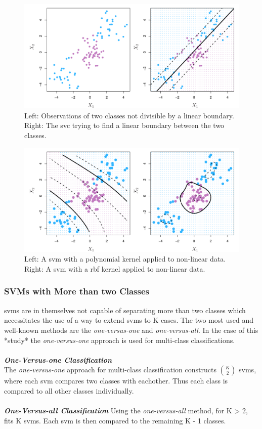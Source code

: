 \documentclass[11pt]{article}
\begin{document}
\begin{figure}[ht]
  \centering
  \includegraphics[width=12cm]{graphics/9_8.pdf}
  \caption{Left: Observations of two classes not divisible by a linear boundary. Right: The \gls{svc} trying to find a linear boundary between the two classes.}
\end{figure}

\begin{figure}[ht]
  \centering
  \includegraphics[width=12cm]{graphics/9_9.pdf}
  \caption{Left: A \gls{svm} with a polynomial kernel applied to non-linear data. Right: A \gls{svm} with a \gls{rbf} kernel applied to non-linear data.}
\end{figure}

\subsubsection{SVMs with More than two Classes}
\glspl{svm} are in themselves not capable of separating more than two classes which necessitates the use of a way to extend \glspl{svm} to K-cases. The two most used and well-known methods are the \textit{one-versus-one} and \textit{one-versus-all}. In the case of this *study* the \textit{one-versus-one} approach is used for multi-class classifications\cite{jamesSupportVectorMachines}.\\
\\
\textbf{\textit{One-Versus-one Classification}}\\
The \textit{one-versus-one} approach for multi-class classification constructs $\binom{K}{2}$ \glspl{svm}, where each \gls{svm} compares two classes with eachother. Thus each class is compared to all other classes individually.\cite{jamesSupportVectorMachines}\\
\\
\textbf{\textit{One-Versus-all Classification}}
Using the \textit{one-versus-all} method, for K > 2, fits K \glspl{svm}. Each \gls{svm} is then compared to the remaining K - 1 classes.\cite{jamesSupportVectorMachines}
\end{document}
